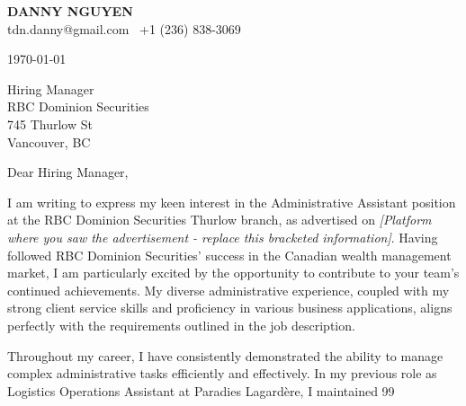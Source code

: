 \documentclass[letterpaper,11pt]{article}
\begin{document}
\textbf{DANNY NGUYEN} \\
tdn.danny@gmail.com \textbullet\ +1 (236) 838-3069 \\
\vspace{20pt}

\today \\
\vspace{20pt}

Hiring Manager \\
RBC Dominion Securities \\
745 Thurlow St \\
Vancouver, BC \\
\vspace{20pt}

Dear Hiring Manager, \\
\vspace{10pt}

I am writing to express my keen interest in the Administrative Assistant position at the RBC Dominion Securities Thurlow branch, as advertised on \textit{[Platform where you saw the advertisement -  replace this bracketed information]}.  Having followed RBC Dominion Securities' success in the Canadian wealth management market, I am particularly excited by the opportunity to contribute to your team's continued achievements. My diverse administrative experience, coupled with my strong client service skills and proficiency in various business applications, aligns perfectly with the requirements outlined in the job description.


\vspace{10pt}

Throughout my career, I have consistently demonstrated the ability to manage complex administrative tasks efficiently and effectively.  In my previous role as Logistics Operations Assistant at Paradies Lagardère, I maintained 99%


\vspace{10pt}
\end{document}
